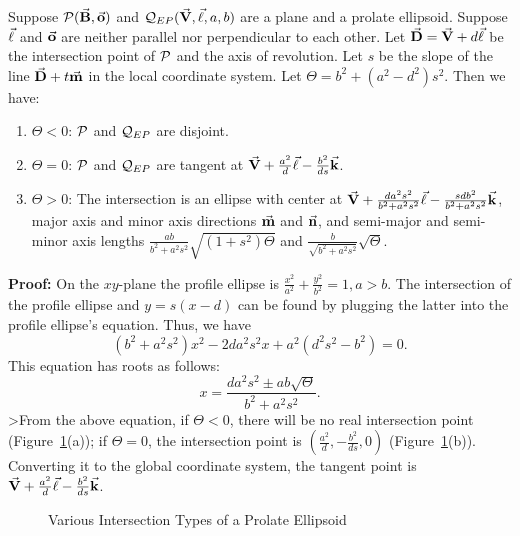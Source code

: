 \begin{theorem}
\label{thm:prolate}
     Suppose ${\cal P}(\vec{\bf B},\vec{\bf o})$ and
${\cal Q}_{EP}(\vec{\bf V},\vec{\bf \ell},a,b)$ are a plane and a prolate
ellipsoid.  Suppose $\vec{\bf \ell}$ and $\vec{\bf o}$ are neither parallel nor
perpendicular to each other.  Let $\vec{\bf D}=\vec{\bf V}+d\vec{\bf \ell}$ be the
intersection point of ${\cal P}$ and the axis of revolution.
Let $s$ be the slope of the
line $\vec{\bf D}+t\vec{\bf m}$ in the local coordinate system.
Let $\Theta=b^2+(a^2-d^2)s^2$.  Then we have:
\begin{enumerate}
     \item $\Theta<0$: ${\cal P}$ and ${\cal Q}_{EP}$ are disjoint.
     \item $\Theta=0$: ${\cal P}$ and ${\cal Q}_{EP}$ are tangent at
          $\vec{\bf V}+\frac{a^2}{d}\vec{\bf \ell}-\frac{b^2}{ds}\vec{\bf k}$.
     \item $\Theta>0$: The intersection is an ellipse with center at
          $\vec{\bf V}+\frac{da^2s^2}{b^2+a^2s^2}\vec{\bf \ell}
               -\frac{sdb^2}{b^2+a^2s^2}\vec{\bf k}$, major axis and minor axis
          directions $\vec{\bf m}$ and $\vec{\bf n}$, and semi-major and semi-minor
          axis lengths $\frac{ab}{b^2+a^2s^2}\sqrt{(1+s^2)\Theta}$ and
          $\frac{b}{\sqrt{b^2+a^2s^2}}\sqrt{\Theta}$.
\end{enumerate}
\end{theorem}
{\bf Proof:}  On the $xy$-plane the profile ellipse is
$\frac{x^2}{a^2}+\frac{y^2}{b^2}=1, a>b$.  The intersection of the profile
ellipse and $y=s(x-d)$ can be found by plugging the latter into the profile
ellipse's equation.  Thus, we have
\begin{equation}
\label{eqn:pro-2degree}
     (b^2+a^2s^2)x^2-2da^2s^2x+a^2(d^2s^2-b^2)=0.
\end{equation}
This equation has roots as follows:
\[ x=\frac{da^2s^2\pm ab\sqrt{\Theta}}{b^2+a^2s^2}. \]
>From the above equation, if $\Theta<0$, there will be no real intersection
point (Figure~\ref{fig:EP}(a)); if $\Theta=0$, the
intersection point is $\left(\frac{a^2}{d},-\frac{b^2}{ds},0\right)$
(Figure~\ref{fig:EP}(b)).  Converting it to the global coordinate system, the
tangent point is $\vec{\bf V}+\frac{a^2}{d}\vec{\bf \ell}-\frac{b^2}{ds}\vec{\bf k}$.
\begin{figure}
\vspace{5cm}
\caption{Various Intersection Types of a Prolate Ellipsoid}
\label{fig:EP}
\end{figure}

